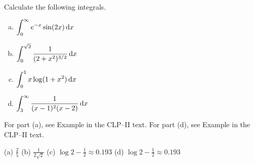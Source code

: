 \begin{question}[2001D]
Calculate the following integrals.
\begin{enumerate}[(a)]
\item
$\displaystyle\int_0^\infty e^{-x} \sin(2x)\,\mathrm{d}x$
\item
 $\displaystyle\int_0^{\sqrt{2}}\frac{1}{(2+x^2)^{3/2}}\,\mathrm{d}x$
\item
$\displaystyle\int_0^1 x\log(1+x^2)\,\mathrm{d}x$
\item
$\displaystyle\int_3^\infty\frac{1}{(x-1)^2(x-2)}\,\mathrm{d}x$
\end{enumerate}
\end{question}

\begin{hint}
For part (a), see  Example  in the
CLP--II text.
For part (d), see  Example  in the
CLP--II text.

\end{hint}

\begin{answer} (a)
$\displaystyle\frac{2}{5}$
\qquad (b)
$\displaystyle\frac{1}{2\sqrt{2}}$
\qquad (c)
$\displaystyle\log 2-\frac{1}{2}\approx 0.193$
\qquad (d)
$\displaystyle\log 2-\frac{1}{2}\approx0.193$
\end{answer}

